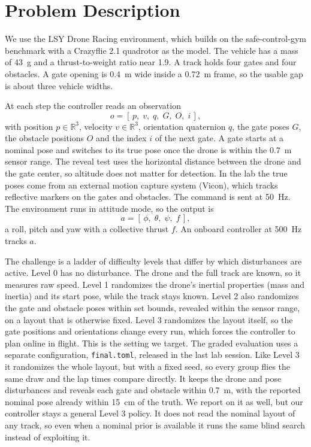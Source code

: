 \documentclass[conference]{IEEEtran}
\begin{document}
\section{Problem Description}
\label{sec:problem}
We use the LSY Drone Racing environment, which builds on the safe-control-gym benchmark \cite{scg} with a Crazyflie 2.1 quadrotor \cite{crazyflie} as the model. The vehicle has a mass of 43~g and a thrust-to-weight ratio near 1.9. A track holds four gates and four obstacles. A gate opening is 0.4~m wide inside a 0.72~m frame, so the usable gap is about three vehicle widths.

At each step the controller reads an observation
\begin{equation}
o = [\, p,\; v,\; q,\; G,\; O,\; i \,],
\label{eq:obs}
\end{equation}
with position $p \in \mathbb{R}^3$, velocity $v \in \mathbb{R}^3$, orientation quaternion $q$, the gate poses $G$, the obstacle positions $O$ and the index $i$ of the next gate. A gate starts at a nominal pose and switches to its true pose once the drone is within the 0.7~m sensor range. The reveal test uses the horizontal distance between the drone and the gate center, so altitude does not matter for detection. In the lab the true poses come from an external motion capture system (Vicon), which tracks reflective markers on the gates and obstacles. The command is sent at 50~Hz. The environment runs in attitude mode, so the output is
\begin{equation}
a = [\, \phi,\; \theta,\; \psi,\; f \,],
\label{eq:act}
\end{equation}
a roll, pitch and yaw with a collective thrust $f$. An onboard controller at 500~Hz tracks $a$.

The challenge is a ladder of difficulty levels that differ by which disturbances are active. Level 0 has no disturbance. The drone and the full track are known, so it measures raw speed. Level 1 randomizes the drone's inertial properties (mass and inertia) and its start pose, while the track stays known. Level 2 also randomizes the gate and obstacle poses within set bounds, revealed within the sensor range, on a layout that is otherwise fixed. Level 3 randomizes the layout itself, so the gate positions and orientations change every run, which forces the controller to plan online in flight. This is the setting we target. The graded evaluation uses a separate configuration, \texttt{final.toml}, released in the last lab session. Like Level 3 it randomizes the whole layout, but with a fixed seed, so every group flies the same draw and the lap times compare directly. It keeps the drone and pose disturbances and reveals each gate and obstacle within 0.7~m, with the reported nominal pose already within 15~cm of the truth. We report on it as well, but our controller stays a general Level 3 policy. It does not read the nominal layout of any track, so even when a nominal prior is available it runs the same blind search instead of exploiting it.
\end{document}
